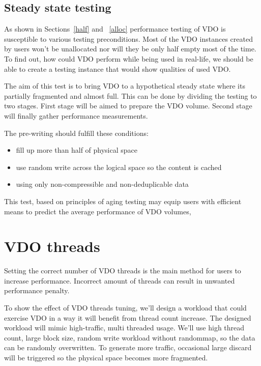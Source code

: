 \documentclass[
  color, %
  table, %
  lof,   %
  lot,   %
]{fithesis3}
\begin{document}
\clearpage

\subsection{Steady state testing}
As shown in Sections~\ref{half} and ~\ref{alloc} performance testing of VDO is susceptible to various testing preconditions. Most of the VDO instances created by users won't be unallocated nor will they be only half empty most of the time. To find out, how could VDO perform while being used in real-life, we should be able to create a testing instance that would show qualities of used VDO.

The aim of this test is to bring VDO to a hypothetical steady state where its partially fragmented and almost full. This can be done by dividing the testing to two stages. First stage will be aimed to prepare the VDO volume. Second stage will finally gather performance measurements.

The pre-writing should fulfill these conditions:
\begin{itemize}
    \item fill up more than half of physical space
    \item use random write across the logical space so the content is cached
    \item using only non-compressible and non-deduplicable data
\end{itemize}

This test, based on principles of aging testing may equip users with efficient means to predict the average performance of VDO volumes,



\clearpage
\section{VDO threads}
Setting the correct number of VDO threads is the main method for users to increase performance. Incorrect amount of threads can result in unwanted performance penalty.

To show the effect of VDO threads tuning, we'll design a workload that could exercise VDO in a way it will benefit from thread count increase. The designed workload will mimic high-traffic, multi threaded usage. We'll use high thread count, large block size, random write workload without randommap, so the data can be randomly overwritten. To generate more traffic, occasional large discard will be triggered so the physical space becomes more fragmented.
\end{document}
